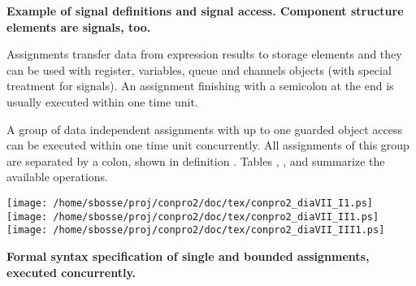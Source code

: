 \documentclass[a4paper,12pt,twoside,english]{article}
\begin{document}
\def\exdescription{\caption{\bf Example of signal definitions and signal access. Component structure elements are signals, too.
}\label{example:5}}
\exampleBplain
\begin{example}[H]\let\normalsize\footnotesize \normalsize
\exdescription
\end{example}
\excontent



\def\thesubsubsection{\vrule width 0pt height 1.3 ex}

\def\thesubsection{\tocXIX}
\secII{\label{toclabelXIX}\thesubsection}
Assignments transfer data from expression results to storage elements and they can be used with
register, variables, queue and channels objects (with special treatment for signals). An assignment finishing with a semicolon at the end is usually executed
within one time unit. 


\vskip5pt
A group of  data independent assignments with up to one guarded object access can be executed within one time unit concurrently. All assignments of this group
are separated by a colon, shown in definition . Tables , ,  and  summarize the
available operations.


\vskip5pt
\def\defcontent{
\begin{center}
\texttt{[image: /home/sbosse/proj/conpro2/doc/tex/conpro2\_diaVII\_I1.ps]}\\\vskip3pt
\texttt{[image: /home/sbosse/proj/conpro2/doc/tex/conpro2\_diaVII\_II1.ps]}\\\vskip3pt
\texttt{[image: /home/sbosse/proj/conpro2/doc/tex/conpro2\_diaVII\_III1.ps]}\\\vskip3pt
\end{center}
}
\def\defdescription{
\caption{\bf Formal syntax specification of  single and bounded assignments, executed concurrently.
}
\label{def:7}}

\begin{definition}
\let\normalsize\footnotesize \normalsize
\defcontent
\defdescription

\end{definition}
\end{document}
